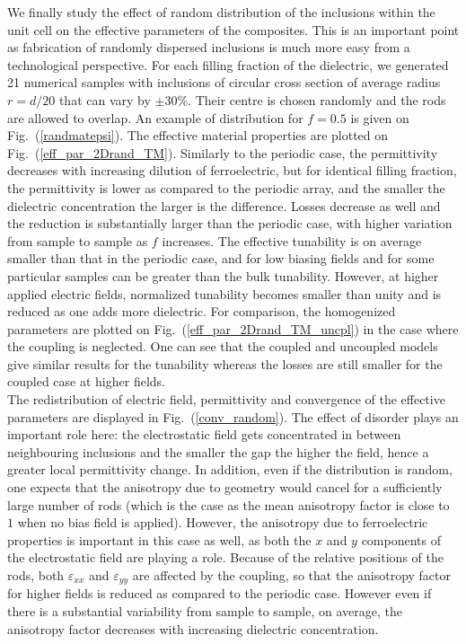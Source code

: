 \documentclass[%
 aip,
 amsmath,amssymb,
 reprint,%
]{revtex4-1}
\newcommand{\fig}[1]{Fig.~(\ref{#1})}
\begin{document}
We finally study the effect of random distribution of the inclusions within the unit cell on the effective parameters of the
composites. This is an important point as fabrication of randomly dispersed
inclusions is much more easy from a technological perspective. For each filling fraction of the dielectric,
we generated 21 numerical samples with inclusions of circular cross section of average radius
$r=d/20$ that can vary by $\pm 30\%$. Their centre is chosen randomly and the
rods are allowed to overlap. An example of distribution for $f=0.5$ is given on \fig{randmatepsi}.
The effective material properties are plotted on \fig{eff_par_2Drand_TM}.
Similarly to the periodic case, the permittivity decreases with increasing dilution of
ferroelectric, but for identical filling fraction,
the permittivity is lower as compared to the periodic array, and the smaller the dielectric concentration the larger
is the difference. Losses decrease as well and the reduction is substantially larger
than the periodic case, with higher variation from sample to sample as $f$ increases.
The effective tunability is on average smaller than that in the periodic case, and
for low biasing fields and for some particular samples can be greater than the bulk tunability. However,
at higher applied electric fields, normalized tunability becomes smaller than unity and
is reduced as one adds more dielectric. For comparison, the homogenized
parameters are plotted on \fig{eff_par_2Drand_TM_uncpl} in the case where the coupling is
neglected. One can see that the coupled and uncoupled models give
similar results for the tunability whereas the losses are still smaller for the coupled case
at higher fields.\\
The redistribution of electric field, permittivity and convergence of
the effective parameters are displayed in \fig{conv_random}. The effect of
disorder plays an important role here: the electrostatic field gets concentrated
in between neighbouring inclusions and the smaller the gap the higher the field, hence
a greater local permittivity change. In addition, even if the distribution is
random, one expects that the anisotropy due to geometry would cancel for a sufficiently large number
of rods (which is the case as the mean anisotropy factor is close to $1$ when no
bias field is applied). However, the anisotropy due to ferroelectric properties is
important in this case as well, as both the $x$ and $y$ components of the electrostatic field
are playing a role.
Because of the relative positions of the rods, both $\varepsilon_{xx}$ and $\varepsilon_{yy}$ are affected
by the coupling, so that the anisotropy factor for higher fields is reduced as compared to the periodic case.
However even if there is a substantial variability from sample to sample, on average, the anisotropy factor
decreases with increasing dielectric concentration.
\end{document}
